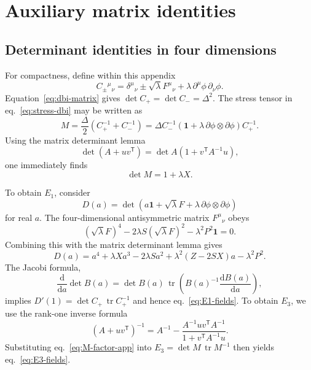 \documentclass[a4paper,11pt]{article}
\numberwithin{equation}{section}
\newcommand{\dd}{\mathrm d}
\newcommand{\tr}{\operatorname{tr}}
\newcommand{\Id}{\mathbf 1}
\begin{document}
\section{Auxiliary matrix identities}
\label{app:matrix-identities}

\subsection{Determinant identities in four dimensions}

For compactness, define within this appendix
\begin{equation}
 C_\pm{}^\mu{}_{\nu}
 =\delta^\mu{}_{\nu}\pm\sqrt\lambda F^\mu{}_{\nu}
 +\lambda\,\partial^\mu\phi\,\partial_\nu\phi.
 \label{eq:Cpm-app}
\end{equation}
Equation~\eqref{eq:dbi-matrix} gives $\det C_+=\det C_-=\Delta^2$. The stress tensor in eq.~\eqref{eq:stress-dbi} may be written as
\begin{equation}
 M=\frac\Delta2(C_+^{-1}+C_-^{-1})
 =\Delta C_-^{-1}\left(\Id+\lambda\,\partial\phi\otimes\partial\phi\right)C_+^{-1}.
 \label{eq:M-factor-app}
\end{equation}
Using the matrix determinant lemma
\begin{equation}
 \det(A+uv^{\mathsf T})=\det A\left(1+v^{\mathsf T}A^{-1}u\right),
 \label{eq:detlemma-app}
\end{equation}
one immediately finds
\begin{equation}
 \det M=1+\lambda X.
\end{equation}

To obtain $E_1$, consider
\begin{equation}
 D(a)=\det\!\left(a\Id+\sqrt\lambda F
 +\lambda\,\partial\phi\otimes\partial\phi\right)
 \label{eq:Da-app}
\end{equation}
for real $a$. The four-dimensional antisymmetric matrix $F^\mu{}_{\nu}$ obeys
\begin{equation}
 (\sqrt\lambda F)^4-2\lambda S(\sqrt\lambda F)^2-\lambda^2P^2\Id=0.
 \label{eq:F-CH-app}
\end{equation}
Combining this with the matrix determinant lemma gives
\begin{equation}
 D(a)=a^4+\lambda Xa^3-2\lambda Sa^2
 +\lambda^2(Z-2SX)a-\lambda^2P^2.
 \label{eq:D-polynomial-app}
\end{equation}
The Jacobi formula,
\begin{equation}
 \frac{\dd}{\dd a}\det B(a)
 =\det B(a)\,\tr\!\left(B(a)^{-1}\frac{\dd B(a)}{\dd a}\right),
 \label{eq:jacobi-app}
\end{equation}
implies $D'(1)=\det C_+\,\tr C_+^{-1}$ and hence eq.~\eqref{eq:E1-fields}. To obtain $E_3$, we use the rank-one inverse formula
\begin{equation}
 (A+uv^{\mathsf T})^{-1}
 =A^{-1}-\frac{A^{-1}uv^{\mathsf T}A^{-1}}
 {1+v^{\mathsf T}A^{-1}u}.
 \label{eq:sherman-morrison-app}
\end{equation}
Substituting eq.~\eqref{eq:M-factor-app} into $E_3=\det M\,\tr M^{-1}$ then yields eq.~\eqref{eq:E3-fields}.
\end{document}
